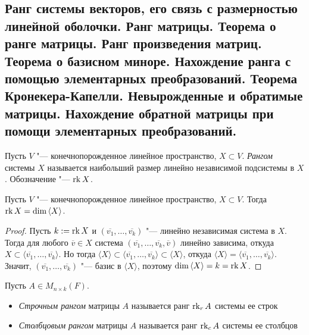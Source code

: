 \subsection{Ранг системы векторов, его связь с размерностью линейной оболочки. Ранг матрицы. Теорема о ранге матрицы. Ранг произведения матриц. Теорема о базисном миноре. Нахождение ранга с помощью элементарных преобразований. Теорема Кронекера-Капелли. Невырожденные и обратимые матрицы. Нахождение обратной матрицы при помощи элементарных преобразований.}

    \begin{definition}
    	Пусть $V$ "--- конечнопорожденное линейное пространство, $X \subset V$. \textit{Рангом} системы $X$ называется наибольший размер линейно независимой подсистемы в $X$. Обозначение "--- $\operatorname{rk}{X}$.
    \end{definition}
    
    \begin{proposition}
    	Пусть $V$ "--- конечнопорожденное линейное пространство, $X \subset V$. Тогда $\operatorname{rk}{X} = \dim{\langle X\rangle}$.
    \end{proposition}
    
    \begin{proof}
    	Пусть $k := \operatorname{rk}{X}$ и $(\overline{v_1}, \dots, \overline{v_k})$ "--- линейно независимая система в $X$. Тогда для любого $\overline{v} \in X$ система $(\overline{v_1}, \dots, \overline{v_k}, \overline{v})$ линейно зависима, откуда $X \subset \langle\overline{v_1}, \dots, \overline{v_k}\rangle$. Но тогда $\langle X \rangle \subset \langle\overline{v_1}, \dots, \overline{v_k}\rangle \subset \langle X \rangle$, откуда $\langle X \rangle = \langle\overline{v_1}, \dots, \overline{v_k}\rangle$. Значит, $(\overline{v_1}, \dots, \overline{v_k})$ "--- базис в $\langle X\rangle$, поэтому $\dim{\langle X\rangle} = k \hm{=} \rk{X}$.
    \end{proof}
    
    \begin{definition}
    	Пусть $A \in M_{n \times k}(F)$.
    	\begin{itemize}
    		\item \textit{Строчным рангом} матрицы $A$ называется ранг $\operatorname{rk}_{r}{A}$ системы ее строк
    		\item \textit{Столбцовым рангом} матрицы $A$ называется ранг $\operatorname{rk}_{c}{A}$ системы ее столбцов
    	\end{itemize}
    \end{definition}
    
